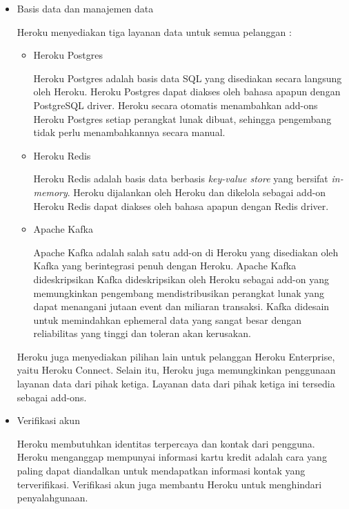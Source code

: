 \documentclass[a4paper,twoside]{article}
\begin{document}
\begin{enumerate}
\begin{itemize}
\begin{itemize}
			\item Basis data dan manajemen data
		
			Heroku menyediakan tiga layanan data untuk semua pelanggan :
			\begin{itemize}
				\item Heroku Postgres
			
				Heroku Postgres adalah basis data SQL yang disediakan secara langsung oleh Heroku. Heroku Postgres dapat diakses oleh bahasa apapun dengan PostgreSQL driver. Heroku secara otomatis menambahkan add-ons Heroku Postgres setiap perangkat lunak dibuat, sehingga pengembang tidak perlu menambahkannya secara manual.
			
				\item Heroku Redis
			
				Heroku Redis adalah basis data berbasis \textit{key-value store} yang bersifat \textit{in-memory}. Heroku dijalankan oleh Heroku dan dikelola sebagai add-on Heroku Redis dapat diakses oleh bahasa apapun dengan Redis driver.
			
				\item Apache Kafka
			
				Apache Kafka adalah salah satu add-on di Heroku yang disediakan oleh Kafka yang berintegrasi penuh dengan Heroku. Apache Kafka dideskripsikan Kafka dideskripsikan oleh Heroku sebagai add-on yang memungkinkan pengembang mendistribusikan perangkat lunak yang dapat menangani jutaan event dan miliaran transaksi. Kafka didesain untuk memindahkan ephemeral data yang sangat besar dengan reliabilitas yang tinggi dan toleran akan kerusakan.
			
			\end{itemize}
			Heroku juga menyediakan pilihan lain untuk pelanggan Heroku Enterprise, yaitu Heroku Connect. Selain itu, Heroku juga memungkinkan penggunaan layanan data dari pihak ketiga. Layanan data dari pihak ketiga ini tersedia sebagai add-ons.

			\item Verifikasi akun
			
			Heroku membutuhkan identitas terpercaya dan kontak dari pengguna. Heroku menganggap mempunyai informasi kartu kredit adalah cara yang paling dapat diandalkan untuk mendapatkan informasi kontak yang terverifikasi. Verifikasi akun juga membantu Heroku untuk menghindari penyalahgunaan.


\end{itemize}
\end{itemize}
\end{enumerate}
\end{document}
